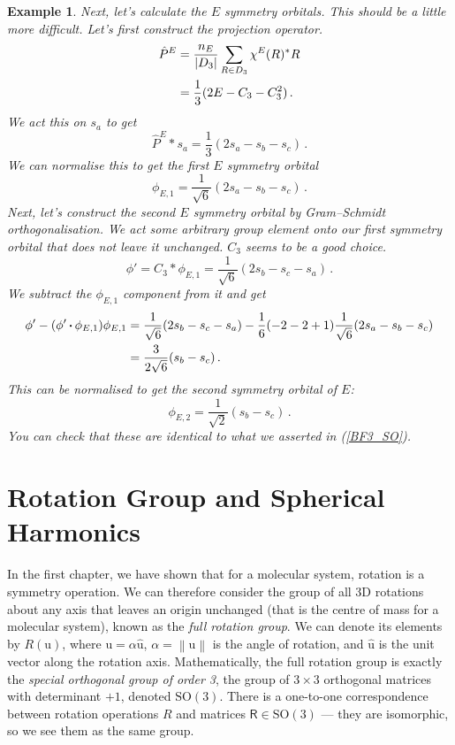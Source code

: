 \documentclass{article}
\theoremstyle{plain}\theoremheaderfont{\normalfont\itshape}\theorembodyfont{\rmfamily}\theoremseparator{.}\newtheorem*{rem}{Remark}\newtheorem*{ex}{Example}\newtheorem*{proof}{Proof}\newtheorem*{altp}{Alternative proof}
\theoremstyle{plain}\theoremheaderfont{\normalfont\bfseries}\theorembodyfont{\rmfamily}\theoremseparator{.}\newtheorem{thm}{Theorem}[section]\newtheorem{lem}[thm]{Lemma}\newtheorem{prop}[thm]{Proposition}\newtheorem*{cor}{Corollary}\newtheorem{defn}[thm]{Definition}\newtheorem{clm}[thm]{Claim}\newtheorem{clminproof}{Claim}\newtheorem*{law}{Law}\newtheorem{pos}[thm]{Postulate}
\theoremstyle{break}\theoremheaderfont{\normalfont\itshape}\theorembodyfont{\rmfamily}\theoremseparator{.\medskip}\newtheorem*{proofskip}{Proof}\newtheorem*{exs}{Examples}\newtheorem*{rems}{Remarks}
\theoremstyle{break}\theoremheaderfont{\normalfont\bfseries}\theorembodyfont{\rmfamily}\theoremseparator{.\medskip}\newtheorem{lemskip}[thm]{Lemma}\newtheorem{defnskip}[thm]{Definition}\newtheorem{propskip}[thm]{Proposition}\newtheorem{thmskip}[thm]{Theorem}
\numberwithin{equation}{section}
\newcommand{\vb}[1]{\bm{\mathrm{#1}}}
\newcommand{\vu}[1]{\hat{\bm{\mathrm{#1}}}}
\newcommand{\vdot}{\,\bm{\mathrm{\cdot}}\,}
\newcommand{\abs}[1]{\left| #1 \right|}
\newcommand{\norm}[1]{\left\| #1 \right\|}
\newcommand{\SO}{\mathrm{SO}}
\begin{document}
\begin{ex}
        Next, let's calculate the \(E\) symmetry orbitals. This should be a little more difficult. Let's first construct the projection operator.
        \begin{align}
            \hat{P}^{E}&=\frac{n_{E}}{\abs{D_3}}\sum_{R\in D_3}\chi^{E}(R)^* R\notag\\
            &=\frac{1}{3}(2E-C_3-C_3^2)\,.
        \end{align}
        We act this on \(s_a\) to get
        \begin{equation}
            \hat{P}^{E}*s_a=\frac{1}{3}(2s_a-s_b-s_c)\,.
        \end{equation}
        We can normalise this to get the first \(E\) symmetry orbital
        \begin{equation}
            \phi_{E,1}=\frac{1}{\sqrt{6}}(2s_a-s_b-s_c)\,.
        \end{equation}
        Next, let's construct the second \(E\) symmetry orbital by Gram--Schmidt orthogonalisation. We act some arbitrary group element onto our first symmetry orbital that does not leave it unchanged. \(C_3\) seems to be a good choice.
        \begin{equation}
            \phi'=C_3*\phi_{E,1}=\frac{1}{\sqrt{6}}(2s_b-s_c-s_a)\,.
        \end{equation}
        We subtract the \(\phi_{E,1}\) component from it and get
        \begin{align}
            \phi'-(\phi'\vdot \phi_{E,1})\phi_{E,1}&=\frac{1}{\sqrt{6}}(2s_b-s_c-s_a)-\frac{1}{6}(-2-2+1)\frac{1}{\sqrt{6}}(2s_a-s_b-s_c)\notag\\
            &=\frac{3}{2\sqrt{6}}(s_b-s_c)\,.
        \end{align}
        This can be normalised to get the second symmetry orbital of \(E\):
        \begin{equation}
            \phi_{E,2}=\frac{1}{\sqrt{2}}(s_b-s_c)\,.
        \end{equation}
        You can check that these are identical to what we asserted in (\ref{BF3_SO}). 
    \end{ex}

    \newpage
    \section{Rotation Group and Spherical Harmonics}
    In the first chapter, we have shown that for a molecular system, rotation is a symmetry operation. We can therefore consider the group of all 3D rotations about any axis that leaves an origin unchanged (that is the centre of mass for a molecular system), known as the \textit{full rotation group}. We can denote its elements by \(R(\vb{u})\), where \(\vb{u}=\alpha\vu{u}\), \(\alpha=\norm{\vb{u}}\) is the angle of rotation, and \(\vu{u}\) is the unit vector along the rotation axis. Mathematically, the full rotation group is exactly the \textit{special orthogonal group of order 3}, the group of \(3\times 3\) orthogonal matrices with determinant \(+1\), denoted \(\SO(3)\). There is a one-to-one correspondence between rotation operations \(R\) and matrices \(\mathsf{R}\in\SO(3)\) --- they are isomorphic, so we see them as the same group.
\end{document}
